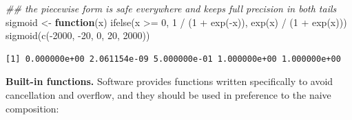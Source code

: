 \documentclass[
  letterpaper,
  DIV=11,
  numbers=noendperiod]{scrreprt}
\newenvironment{Shaded}{\begin{snugshade}}{\end{snugshade}}
\newcommand{\ControlFlowTok}[1]{\textcolor[rgb]{0.00,0.23,0.31}{\textbf{#1}}}
\newcommand{\DecValTok}[1]{\textcolor[rgb]{0.68,0.00,0.00}{#1}}
\newcommand{\DocumentationTok}[1]{\textcolor[rgb]{0.37,0.37,0.37}{\textit{#1}}}
\newcommand{\FunctionTok}[1]{\textcolor[rgb]{0.28,0.35,0.67}{#1}}
\newcommand{\NormalTok}[1]{\textcolor[rgb]{0.00,0.23,0.31}{#1}}
\newcommand{\OtherTok}[1]{\textcolor[rgb]{0.00,0.23,0.31}{#1}}
\newcommand{\SpecialCharTok}[1]{\textcolor[rgb]{0.37,0.37,0.37}{#1}}
\begin{document}
\begin{Shaded}
\begin{Highlighting}[]
\DocumentationTok{\#\# the piecewise form is safe everywhere and keeps full precision in both tails}
\NormalTok{sigmoid }\OtherTok{\textless{}{-}} \ControlFlowTok{function}\NormalTok{(x) }\FunctionTok{ifelse}\NormalTok{(x }\SpecialCharTok{\textgreater{}=} \DecValTok{0}\NormalTok{, }\DecValTok{1} \SpecialCharTok{/}\NormalTok{ (}\DecValTok{1} \SpecialCharTok{+} \FunctionTok{exp}\NormalTok{(}\SpecialCharTok{{-}}\NormalTok{x)), }\FunctionTok{exp}\NormalTok{(x) }\SpecialCharTok{/}\NormalTok{ (}\DecValTok{1} \SpecialCharTok{+} \FunctionTok{exp}\NormalTok{(x)))}
\FunctionTok{sigmoid}\NormalTok{(}\FunctionTok{c}\NormalTok{(}\SpecialCharTok{{-}}\DecValTok{2000}\NormalTok{, }\SpecialCharTok{{-}}\DecValTok{20}\NormalTok{, }\DecValTok{0}\NormalTok{, }\DecValTok{20}\NormalTok{, }\DecValTok{2000}\NormalTok{))}
\end{Highlighting}
\end{Shaded}

\begin{verbatim}
[1] 0.000000e+00 2.061154e-09 5.000000e-01 1.000000e+00 1.000000e+00
\end{verbatim}

\textbf{Built-in functions.} Software provides functions written
specifically to avoid cancellation and overflow, and they should be used
in preference to the naive composition:
\end{document}
